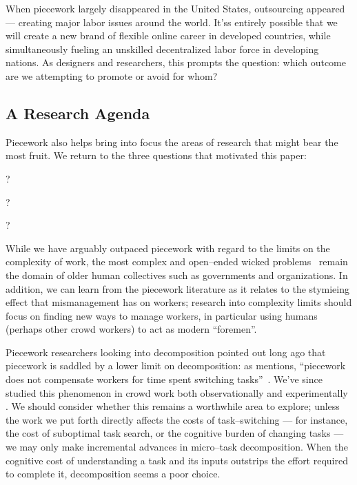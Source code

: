 \documentclass[pn4226]{subfiles}
\begin{document}
When piecework largely disappeared in the United States, outsourcing appeared --- creating major labor issues around the world.
It'ss entirely possible that we will create a new brand of flexible online career in developed countries,
while simultaneously fueling an unskilled decentralized labor force in developing nations.
As designers and researchers, this prompts the question: which outcome are we attempting to promote or avoid for whom?


\subsection{A Research Agenda}\label{sec:whatShouldBeTheFuture}
Piecework also helps bring into focus the
areas of research that might bear the most fruit.
We return to the three questions that motivated this paper:
\begin{inlinelist}
  \item {}?
  \item {}?
  \item {}?
\end{inlinelist}

While we have arguably outpaced piecework with regard to the limits on the complexity of work,
the most complex and open--ended wicked problems~\cite{rittel1973dilemmas} remain the domain of older human collectives such as governments and organizations. 
In addition, we can learn from the piecework literature as it relates to
the stymieing effect that mismanagement has on workers;
research into complexity limits should focus on finding new ways to manage workers,
in particular using humans (perhaps other crowd workers)
to act as modern ``foremen''.

Piecework researchers looking into decomposition pointed out long ago that
piecework is saddled by a lower limit on decomposition:
as \citeauthor{bewley1999wages} mentions,
``piecework does not compensate workers for time spent switching tasks''~\cite{bewley1999wages}. 
We've since studied this phenomenon in crowd work both
observationally \cite{taskSearch} and
experimentally \cite{delayAndOrderLasecki}.
We should consider whether this remains a worthwhile area to explore;
unless the work we put forth directly affects the costs of task--switching
--- for instance, the cost of suboptimal task search, or the cognitive burden of changing tasks ---
we may only make incremental advances in micro--task decomposition.
When the cognitive cost of understanding a task and its inputs outstrips the effort required to complete it, decomposition seems a poor choice.
\end{document}
